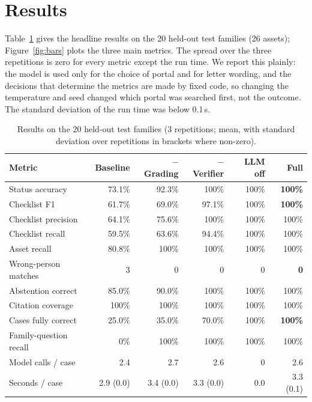\documentclass[12pt,a4paper,oneside]{report}
\begin{document}
\section{Results}
Table~\ref{tab:main} gives the headline results on the 20 held-out test families (26 assets); Figure~\ref{fig:bars} plots the three main metrics. The spread over the three repetitions is zero for every metric except the run time. We report this plainly: the model is used only for the choice of portal and for letter wording, and the decisions that determine the metrics are made by fixed code, so changing the temperature and seed changed which portal was searched first, not the outcome. The standard deviation of the run time was below 0.1\,s.

\begin{table}[H]
\centering\footnotesize{}
\caption[Results on the held-out test families]{Results on the 20 held-out test families (3 repetitions; mean, with standard deviation over repetitions in brackets where non-zero).}\label{tab:main}
\renewcommand{\arraystretch}{1.1}
\begin{tabularx}{\linewidth}{@{}p{3.6cm}rrrrr@{}}
\toprule
\textbf{Metric} & \textbf{Baseline} & \textbf{$-$Grading} & \textbf{$-$Verifier} & \textbf{LLM off} & \textbf{Full} \\ \midrule
Status accuracy & 73.1\% & 92.3\% & 100\% & 100\% & \textbf{100\%} \\
Checklist F1 & 61.7\% & 69.0\% & 97.1\% & 100\% & \textbf{100\%} \\
Checklist precision & 64.1\% & 75.6\% & 100\% & 100\% & 100\% \\
Checklist recall & 59.5\% & 63.6\% & 94.4\% & 100\% & 100\% \\
Asset recall & 80.8\% & 100\% & 100\% & 100\% & 100\% \\
Wrong-person matches & 3 & 0 & 0 & 0 & \textbf{0} \\
Abstention correct & 85.0\% & 90.0\% & 100\% & 100\% & 100\% \\
Citation coverage & 100\% & 100\% & 100\% & 100\% & 100\% \\
Cases fully correct & 25.0\% & 35.0\% & 70.0\% & 100\% & \textbf{100\%} \\
Family-question recall & 0\% & 100\% & 100\% & 100\% & 100\% \\
Model calls / case & 2.4 & 2.7 & 2.6 & 0 & 2.6 \\
Seconds / case & 2.9 (0.0) & 3.4 (0.0) & 3.3 (0.0) & 0.0 & 3.3 (0.1) \\ \bottomrule
\end{tabularx}
\end{table}
\end{document}
